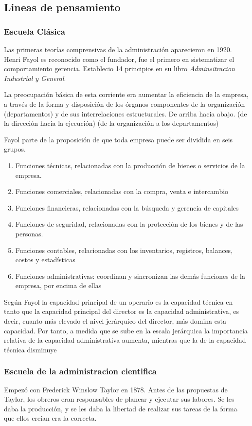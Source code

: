 \documentclass[titlepage,a4paper]{article}
\begin{document}
\subsection{Lineas de pensamiento}
\subsubsection*{Escuela Clásica}
Las primeras teorías comprensivas de la administración aparecieron en 1920. Henri Fayol es reconocido como el fundador, fue el primero en sistematizar el comportamiento gerencia. Establecio 14 principios en su libro \textit{Adminsitracion Industrial y General}.

La preocupación básica de esta corriente era aumentar la eficiencia de la empresa, a través de la forma y disposición de los órganos componentes de la organización (departamentos) y de sus interrelaciones estructurales. De arriba hacia abajo. (de la dirección hacia la ejecución) (de la organización a los departamentos)

Fayol parte de la proposición de que toda empresa puede ser dividida en seis grupos.
\begin{enumerate}
    \item Funciones técnicas, relacionadas con la producción de bienes o servicios de la empresa. 
    \item Funciones comerciales, relacionadas con la compra, venta e intercambio
    \item Funciones financieras, relacionadas con la búsqueda y gerencia de capitales
    \item Funciones de seguridad, relacionadas con la protección de los bienes y de las personas. 
    \item Funciones contables, relacionadas con los inventarios, registros, balances, costos y estadísticas
    \item Funciones administrativas: coordinan y sincronizan las demás funciones de la empresa, por encima de ellas
\end{enumerate}

Según Fayol la capacidad principal de un operario es la capacidad técnica en tanto que la capacidad principal del director es la capacidad administrativa, es decir, cuanto más elevado el nivel jerárquico del director, más domina esta capacidad. Por tanto, a medida que se sube en la escala jerárquica la importancia relativa de la capacidad administrativa aumenta, mientras que la de la capacidad técnica disminuye
 
\subsubsection*{Escuela de la administracion cientifica}
Empezó con Frederick Winslow Taylor en 1878. Antes de las propuestas de Taylor, los obreros eran responsables de planear y ejecutar sus labores. Se les daba la producción, y se les daba la libertad de realizar sus tareas de la forma que ellos creían era la correcta.
\end{document}
